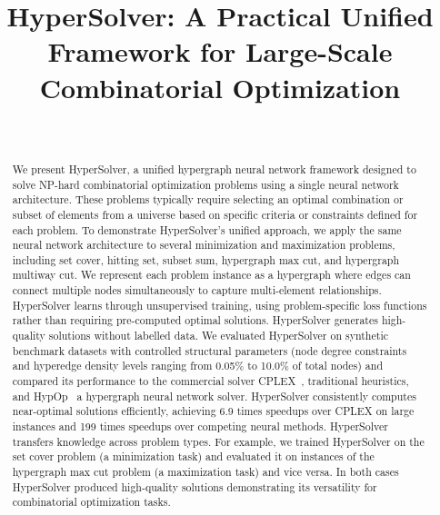 \documentclass[conference]{IEEEtran}
\begin{document}
\title{HyperSolver: A Practical Unified Framework for Large-Scale Combinatorial Optimization \\}


\author{
\and
{}
\\ }


\maketitle

\begin{abstract}
We present HyperSolver, a unified hypergraph neural network framework designed to solve NP-hard combinatorial optimization problems using a single neural network architecture. These problems typically require selecting an optimal combination or subset of elements from a universe based on specific criteria or constraints defined for each problem. To demonstrate HyperSolver's unified approach, we apply the same neural network architecture to several minimization and maximization problems, including set cover, hitting set, subset sum, hypergraph max cut, and hypergraph multiway cut. We represent each problem instance as a hypergraph where edges can connect multiple nodes simultaneously to capture multi-element relationships. HyperSolver learns through unsupervised training, using problem-specific loss functions rather than requiring pre-computed optimal solutions. HyperSolver generates high-quality solutions without labelled data. We evaluated HyperSolver on synthetic benchmark datasets with controlled structural parameters (node degree constraints and hyperedge density levels ranging from 0.05\% to 10.0\% of total nodes) and compared its performance to the commercial solver CPLEX~\cite{IBM2020}, traditional heuristics, and HypOp~\cite{Heydaribeni2024} a hypergraph neural network solver. HyperSolver consistently computes near-optimal solutions efficiently, achieving 6.9 times speedups over CPLEX on large instances and 199 times speedups over competing neural methods. HyperSolver transfers knowledge across problem types. For example, we trained HyperSolver on the set cover problem (a minimization task) and evaluated it on instances of the hypergraph max cut problem (a maximization task) and vice versa. In both cases HyperSolver produced high-quality solutions demonstrating its versatility for combinatorial optimization tasks.
\end{abstract}
\end{document}
